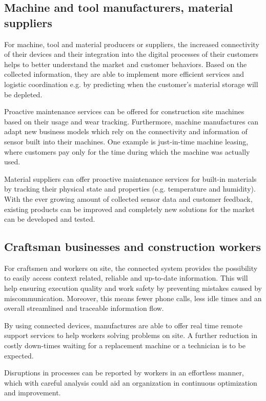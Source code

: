 \subsection{Machine and tool manufacturers, material suppliers}
For machine, tool and material producers or suppliers, the increased connectivity of their devices and their integration into the digital processes of their customers helps to better understand the market and customer behaviors. 
Based on the collected information, they are able to implement more efficient services and logistic coordination e.g. by predicting when the customer's material storage will be depleted.

Proactive maintenance services can be offered for construction site machines based on their usage and wear tracking. 
Furthermore, machine manufactures can adapt new business models which rely on the connectivity and information of sensor built into their machines. One example is just-in-time machine leasing, where customers pay only for the time during which the machine was actually used.

Material suppliers can offer proactive maintenance services for built-in materials by tracking their physical state and properties (e.g. temperature and humidity).
With the ever growing amount of collected sensor data and customer feedback, existing products can be improved and completely new solutions for the market can be developed and tested.


\subsection{Craftsman businesses and construction workers}
For craftsmen and workers on site, the connected system provides the possibility to easily access context related, reliable and up-to-date information. 
This will help ensuring execution quality and work safety by preventing mistakes caused by miscommunication. Moreover, this means fewer phone calls, less idle times and an overall streamlined and traceable information flow.

By using connected devices, manufactures are able to offer real time remote support services to help workers solving problems on site. A further reduction in costly down-times waiting for a replacement machine or a technician is to be expected.

Disruptions in processes can be reported by workers in an effortless manner, which with careful analysis could aid an organization in continuous optimization and improvement.

